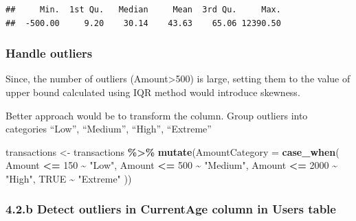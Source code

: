 \documentclass[
]{article}
\newenvironment{Shaded}{\begin{snugshade}}{\end{snugshade}}
\newcommand{\AttributeTok}[1]{\textcolor[rgb]{0.13,0.29,0.53}{#1}}
\newcommand{\ConstantTok}[1]{\textcolor[rgb]{0.56,0.35,0.01}{#1}}
\newcommand{\DecValTok}[1]{\textcolor[rgb]{0.00,0.00,0.81}{#1}}
\newcommand{\FunctionTok}[1]{\textcolor[rgb]{0.13,0.29,0.53}{\textbf{#1}}}
\newcommand{\NormalTok}[1]{#1}
\newcommand{\OtherTok}[1]{\textcolor[rgb]{0.56,0.35,0.01}{#1}}
\newcommand{\SpecialCharTok}[1]{\textcolor[rgb]{0.81,0.36,0.00}{\textbf{#1}}}
\newcommand{\StringTok}[1]{\textcolor[rgb]{0.31,0.60,0.02}{#1}}
\begin{document}
\begin{verbatim}
##     Min.  1st Qu.   Median     Mean  3rd Qu.     Max. 
##  -500.00     9.20    30.14    43.63    65.06 12390.50
\end{verbatim}

\subsubsection{Handle outliers}\label{handle-outliers}

Since, the number of outliers (Amount\textgreater500) is large, setting
them to the value of upper bound calculated using IQR method would
introduce skewness.

Better approach would be to transform the column. Group outliers into
categories ``Low'', ``Medium'', ``High'', ``Extreme''

\begin{Shaded}
\begin{Highlighting}[]
\NormalTok{transactions }\OtherTok{\textless{}{-}}\NormalTok{ transactions }\SpecialCharTok{\%\textgreater{}\%}
  \FunctionTok{mutate}\NormalTok{(}\AttributeTok{AmountCategory =} \FunctionTok{case\_when}\NormalTok{(}
\NormalTok{    Amount }\SpecialCharTok{\textless{}=} \DecValTok{150} \SpecialCharTok{\textasciitilde{}} \StringTok{"Low"}\NormalTok{,}
\NormalTok{    Amount }\SpecialCharTok{\textless{}=} \DecValTok{500} \SpecialCharTok{\textasciitilde{}} \StringTok{"Medium"}\NormalTok{,}
\NormalTok{    Amount }\SpecialCharTok{\textless{}=} \DecValTok{2000} \SpecialCharTok{\textasciitilde{}} \StringTok{"High"}\NormalTok{,}
    \ConstantTok{TRUE} \SpecialCharTok{\textasciitilde{}} \StringTok{"Extreme"}
\NormalTok{  ))}
\end{Highlighting}
\end{Shaded}

\subsubsection{4.2.b Detect outliers in CurrentAge column in Users
table}\label{b-detect-outliers-in-currentage-column-in-users-table}
\end{document}
